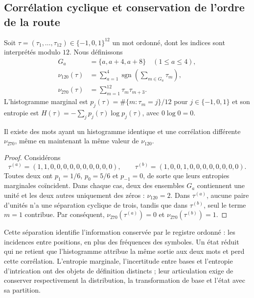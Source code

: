 \subsection{Corrélation cyclique et conservation de l'ordre de la route}
\label{sec:rec27-memoria}

Soit $\tau=(\tau_1,\ldots,\tau_{12})\in\{-1,0,1\}^{12}$ un mot
ordonné, dont les indices sont interprétés modulo $12$. Nous définissons
\[
\begin{aligned}
 G_a&=\{a,a+4,a+8\}\quad(1\leq a\leq4),\\
 \nu_{120}(\tau)&=\sum_{a=1}^4\operatorname{sgn}
 \left(\sum_{m\in G_a}\tau_m\right),\\
 \nu_{270}(\tau)&=\sum_{m=1}^{12}\tau_m\tau_{m+3}.
\end{aligned}
\]
L'histogramme marginal est $p_j(\tau)=\#\{m:\tau_m=j\}/12$ pour
$j\in\{-1,0,1\}$ et son entropie est
$H(\tau)=-\sum_j p_j(\tau)\log p_j(\tau)$, avec $0\log0=0$.

\begin{proposition}
Il existe des mots ayant un histogramme identique et une corrélation différente
$\nu_{270}$, même en maintenant la même valeur de $\nu_{120}$.
\end{proposition}
\begin{proof}
Considérons
\[
 \tau^{(a)}=(1,1,0,0,0,0,0,0,0,0,0,0),\qquad
 \tau^{(b)}=(1,0,0,1,0,0,0,0,0,0,0,0).
\]
Toutes deux ont $p_1=1/6$, $p_0=5/6$ et $p_{-1}=0$, de sorte que leurs
entropies marginales coïncident. Dans chaque cas, deux des ensembles $G_a$
contiennent une unité et les deux autres uniquement des zéros : $\nu_{120}=2$.
Dans $\tau^{(a)}$, aucune paire d'unités n'a une séparation cyclique de trois,
tandis que dans $\tau^{(b)}$, seul le terme $m=1$ contribue.
Par conséquent, $\nu_{270}(\tau^{(a)})=0$ et $\nu_{270}(\tau^{(b)})=1$.
\end{proof}

Cette séparation identifie l'information conservée par le registre ordonné : les incidences entre positions, en plus des fréquences des symboles. Un état réduit qui ne retient que l'histogramme attribue la même sortie aux deux mots et perd cette corrélation. L'entropie marginale, l'incertitude entre bases et l'entropie d'intrication ont des objets de définition distincts ; leur articulation exige de conserver respectivement la distribution, la transformation de base et l'état avec sa partition.
